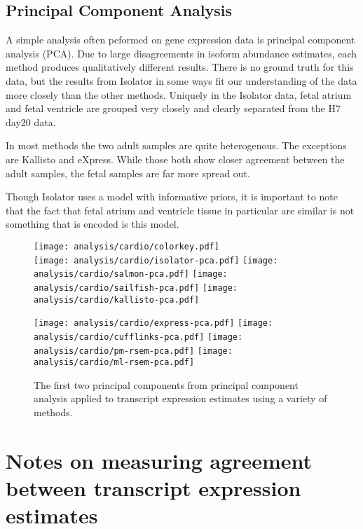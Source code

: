 \documentclass{article}
\begin{document}
\subsection{Principal Component Analysis}\label{cardiopca}

A simple analysis often peformed on gene expression data is principal component
analysis (PCA). Due to large disagreements in isoform abundance estimates, each
method produces qualitatively different results. There is no ground truth for
this data, but the results from Isolator in some ways fit our understanding of
the data more closely than the other methods. Uniquely in the Isolator data,
fetal atrium and fetal ventricle are grouped very closely and clearly separated
from the H7 day20 data.

In most methods the two adult samples are quite heterogenous. The exceptions are
Kallisto and eXpress. While those both show closer agreement between the adult
samples, the fetal samples are far more spread out.

Though Isolator uses a model with informative priors, it is important to note
that the fact that fetal atrium and ventricle tissue in particular are similar
is not something that is encoded is this model.

\begin{figure}[H]
\texttt{[image: analysis/cardio/colorkey.pdf]} \\
\texttt{[image: analysis/cardio/isolator-pca.pdf]}
\texttt{[image: analysis/cardio/salmon-pca.pdf]}
\texttt{[image: analysis/cardio/sailfish-pca.pdf]}
\texttt{[image: analysis/cardio/kallisto-pca.pdf]}
\end{figure}
\begin{figure}
\ContinuedFloat
\texttt{[image: analysis/cardio/express-pca.pdf]}
\texttt{[image: analysis/cardio/cufflinks-pca.pdf]}
\texttt{[image: analysis/cardio/pm-rsem-pca.pdf]}
\texttt{[image: analysis/cardio/ml-rsem-pca.pdf]}
\caption{The first two principal components from principal component analysis
applied to transcript expression estimates using a variety of methods.}
\label{fig:cardiopca}
\end{figure}

\section{Notes on measuring agreement between transcript expression estimates}
\end{document}
